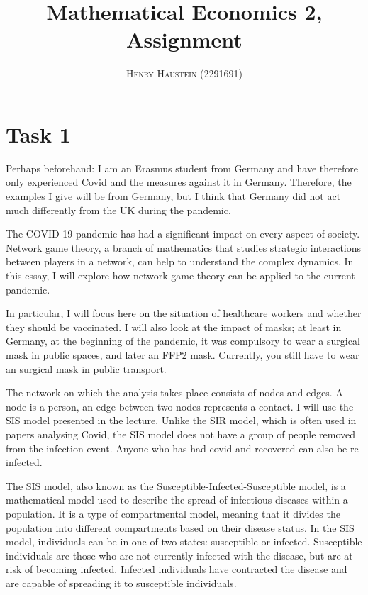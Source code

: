 \documentclass{article}
\title{\textbf{Mathematical Economics 2, Assignment}}
\author{\textsc{Henry Haustein} (2291691)}
\date{}
\begin{document}
	\maketitle
	
	\section*{Task 1}
	
	Perhaps beforehand: I am an Erasmus student from Germany and have therefore only experienced Covid and the measures against it in Germany. Therefore, the examples I give will be from Germany, but I think that Germany did not act much differently from the UK during the pandemic.
	
	The COVID-19 pandemic has had a significant impact on every aspect of society. Network game theory, a branch of mathematics that studies strategic interactions between players in a network, can help to understand the complex dynamics. In this essay, I will explore how network game theory can be applied to the current pandemic.
	
	In particular, I will focus here on the situation of healthcare workers and whether they should be vaccinated. I will also look at the impact of masks; at least in Germany, at the beginning of the pandemic, it was compulsory to wear a surgical mask in public spaces, and later an FFP2 mask. Currently, you still have to wear an surgical mask in public transport.
	
	The network on which the analysis takes place consists of nodes and edges. A node is a person, an edge between two nodes represents a contact. I will use the SIS model presented in the lecture. Unlike the SIR model, which is often used in papers analysing Covid, the SIS model does not have a group of people removed from the infection event. Anyone who has had covid and recovered can also be re-infected.
	
	The SIS model, also known as the Susceptible-Infected-Susceptible model, is a mathematical model used to describe the spread of infectious diseases within a population. It is a type of compartmental model, meaning that it divides the population into different compartments based on their disease status. In the SIS model, individuals can be in one of two states: susceptible or infected. Susceptible individuals are those who are not currently infected with the disease, but are at risk of becoming infected. Infected individuals have contracted the disease and are capable of spreading it to susceptible individuals.
\end{document}
